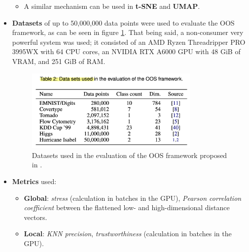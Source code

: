 \documentclass[a4paper,12pt]{article}
\begin{document}
\begin{itemize}
\begin{itemize}
        \item A similar mechanism can be used in \textbf{t-SNE} and \textbf{UMAP}.
    \end{itemize}
    \item \textbf{Datasets} of up to 50,000,000 data points were used to evaluate the OOS framework, as can be seen in figure \ref{fig:OOS_datasets}. That being said, a non-consumer very powerful system was used; it consisted of an AMD Ryzen Threadripper PRO 3995WX with 64 CPU cores, an NVIDIA RTX A6000 GPU with 48 GiB of VRAM, and 251 GiB of RAM.
    
    \begin{figure}[ht]
        \centering
        \includegraphics[width=0.8\textwidth]{figures/OOS_datasets.png}
        \caption{Datasets used in the evaluation of the OOS framework proposed in \cite{reichmann2024outofcoredimensionalityreductionlarge}.}
        \label{fig:OOS_datasets}
    \end{figure}
    
    \item \textbf{Metrics} used:
    \begin{itemize}
        \item \textbf{Global}: \textit{stress} (calculation in batches in the GPU), \textit{Pearson correlation coefficient} between the flattened low- and high-dimensional distance vectors.
        \item \textbf{Local}: \textit{KNN precision}, \textit{trustworthiness} (calculation in batches in the GPU).
    \end{itemize}
    

\end{itemize}
\end{document}
